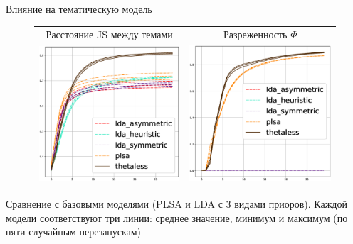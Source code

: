 \begin{frame}{Влияние на тематическую модель}

\begin{figure}
\setlength\tabcolsep{0pt} %
\begin{tabular}{cc}
Расстояние JS между темами & Разреженность $\Phi$\\
\includegraphics[width=54mm]{images/CH4_baselines_diversity_jensenshannon_False.eps} &
\includegraphics[width=54mm]{images/CH4_baselines_SparsityPhiScore.eps} \end{tabular}
\end{figure}
Сравнение с базовыми моделями (PLSA и LDA с 3 видами приоров). Каждой модели соответствуют три линии: среднее значение, минимум и максимум (по пяти случайным перезапускам)
\end{frame}

